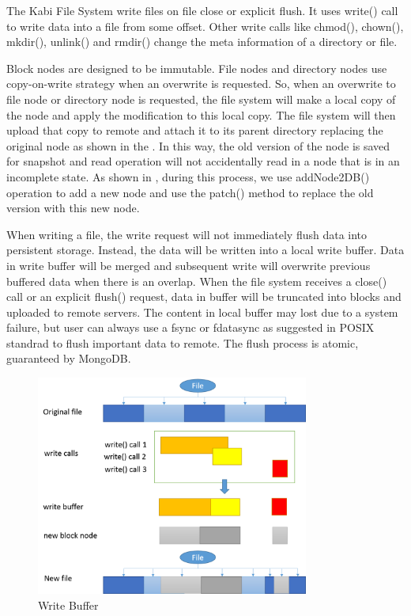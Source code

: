     The Kabi File System write files on file close or explicit flush. It uses write() call to write data into a file from some offset. Other write calls like chmod(), chown(), mkdir(), unlink() and rmdir() change the meta information of a directory or file.

    Block nodes are designed to be immutable. File nodes and directory nodes use copy-on-write strategy when an overwrite is requested. So, when an overwrite to file node or directory node is requested, the file system will make a local copy of the node and apply the modification to this local copy. The file system will then upload that copy to remote and attach it to its parent directory replacing the original node as shown in the . In this way, the old version of the node is saved for snapshot and read operation will not accidentally read in a node that is in an incomplete state. As shown in , during this process, we use addNode2DB() operation to add a new node and use the patch() method to replace the old version with this new node.

	When writing a file, the write request will not immediately flush data into persistent storage. Instead, the data will be written into a local write buffer. Data in write buffer will be merged and subsequent write will overwrite previous buffered data when there is an overlap. When the file system receives a close() call or an explicit flush() request, data in buffer will be truncated into blocks and uploaded to remote servers. The content in local buffer may lost due to a system failure, but user can always use a fsync or fdatasync as suggested in POSIX standrad to flush important data to remote. The flush process is atomic, guaranteed by MongoDB. 

\begin{figure}[hbtp]
\centering
\includegraphics[width=0.8\textwidth]{Chapter-3/figs/fig11.png}
\caption{Write Buffer}
\label{fig:buffer}
\end{figure}

